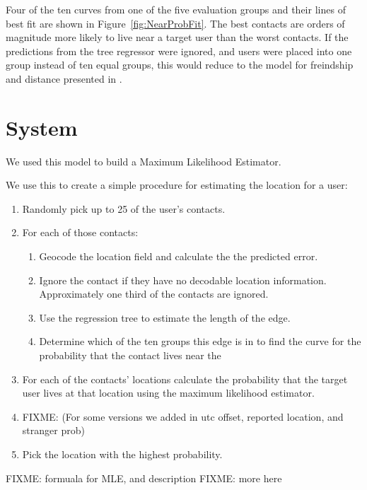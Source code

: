 Four of the ten curves from one of the five evaluation groups and their lines
of best fit are shown in Figure~\ref{fig:NearProbFit}.
%
The best contacts are orders of magnitude more
likely to live near a target user than the worst contacts.
%
If the predictions from the tree regressor were ignored, and users were placed
into one group instead of ten equal groups, this would reduce to the model
for freindship and distance presented in \cite{backstrom2010find}.


\section{System}
We used this model to build a Maximum Likelihood Estimator.


We use this to create a simple procedure for estimating the location for a user:
\begin{enumerate}
\item Randomly pick up to 25 of the user's contacts.
\item For each of those contacts:
\begin{enumerate}
    \item Geocode the location field and calculate the the predicted error.
    \item Ignore the contact if they have no decodable location information.
    Approximately one third of the contacts are ignored.
    \item Use the regression tree to estimate the length of the edge.
    \item Determine which of the ten groups this edge is in to find the curve
        for the probability that the contact lives near the
\end{enumerate}
\item For each of the contacts' locations calculate the probability that the
target user lives at that location using the maximum likelihood estimator.
\item FIXME: (For some versions we added in utc offset, reported location, and stranger prob)
\item Pick the location with the highest probability.
\end{enumerate}

FIXME: formuala for MLE, and description
FIXME: more here

